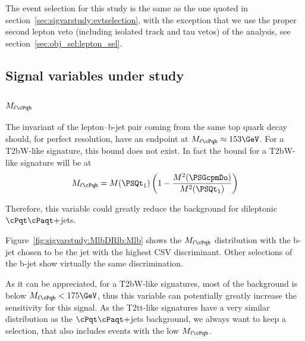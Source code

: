 The event selection for this study is the same as the one quoted in section~\ref{sec:sigvarstudy:evtselection}, with the exception that we use the proper second lepton veto (including isolated track and tau vetos) of the analysis, see section~\ref{sec:obj_sel:lepton_sel}.

\subsection{Signal variables under study}
\label{sec:sigvarstudy:variables2}

\subsubsection{$M_{\ell\cPqb}$}

The invariant of the lepton--b-jet pair coming from the same top quark decay should, for perfect resolution, have an endpoint at $M_{\ell\cPqb} \approx 153\GeV$. For a T2bW-like signature, this bound does not exist. In fact the bound for a T2bW-like signature will be at 
\begin{equation*}
M_{\ell\cPqb} = M(\PSQt_1) \left(1-\frac{M^2(\PSGcpmDo)}{M^2(\PSQt_1)}\right)
\end{equation*}

Therefore, this variable could greatly reduce the background for dileptonic $\cPqt\cPaqt+$jets.

Figure~\ref{fig:sigvarstudy:MlbDRlb:Mlb} shows the $M_{\ell \cPqb}$ distribution with the b-jet chosen to be the jet with the highest CSV discriminant. Other selections of the b-jet show virtually the same discrimination.

As it can be appreciated, for a T2bW-like signatures, most of the background is below $M_{\ell\cPqb} < 175\GeV$, thus this variable can potentially greatly increase the sensitivity for this signal.
As the T2tt-like signatures have a very similar distribution as the $\cPqt\cPaqt+$jets background, we always want to keep a selection, that also includes events with the low $M_{\ell\cPqb}$.


